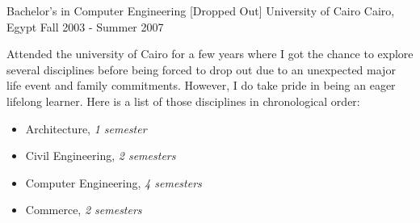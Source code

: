 
\begin{cventries}
	\cventry
	{Bachelor's in Computer Engineering [Dropped Out]} %
	{University of Cairo} %
	{Cairo, Egypt} %
	{Fall 2003 - Summer 2007} %
	{
		Attended the university of Cairo for a few years where I got the chance to
		explore several disciplines before being forced to drop out due to an
		unexpected major life event and family commitments. However, I do take
		pride in being an eager lifelong learner. Here is a list of those
		disciplines in chronological order:
		\begin{itemize}[leftmargin=2ex, nosep, noitemsep, topsep=1.5mm]
			\setlength{\parskip}{0pt}
			\renewcommand{\labelitemi}{\bullet}
				\item{Architecture, \textit{1 semester}}
				\item{Civil Engineering, \textit{2 semesters}}
				\item{Computer Engineering, \textit{4 semesters}}
				\item{Commerce, \textit{2 semesters}}
		\end{itemize}
	}
\end{cventries}
